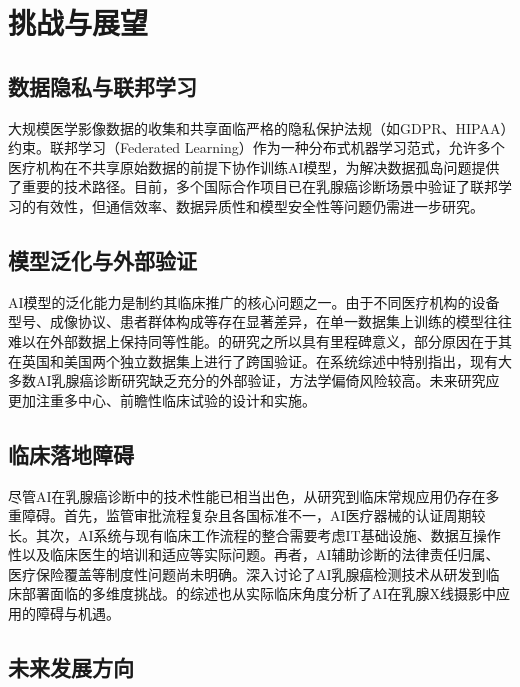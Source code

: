 \documentclass[12pt,a4paper]{article}
\begin{document}
\section{挑战与展望}

\subsection{数据隐私与联邦学习}

大规模医学影像数据的收集和共享面临严格的隐私保护法规（如GDPR、HIPAA）约束。联邦学习（Federated Learning）\citep{mcmahan2017communication}作为一种分布式机器学习范式，允许多个医疗机构在不共享原始数据的前提下协作训练AI模型，为解决数据孤岛问题提供了重要的技术路径\citep{rieke2020future}。目前，多个国际合作项目已在乳腺癌诊断场景中验证了联邦学习的有效性，但通信效率、数据异质性和模型安全性等问题仍需进一步研究。

\subsection{模型泛化与外部验证}

AI模型的泛化能力是制约其临床推广的核心问题之一。由于不同医疗机构的设备型号、成像协议、患者群体构成等存在显著差异，在单一数据集上训练的模型往往难以在外部数据上保持同等性能。\citet{mckinney2020international}的研究之所以具有里程碑意义，部分原因在于其在英国和美国两个独立数据集上进行了跨国验证。\citet{freeman2021use}在系统综述中特别指出，现有大多数AI乳腺癌诊断研究缺乏充分的外部验证，方法学偏倚风险较高。未来研究应更加注重多中心、前瞻性临床试验的设计和实施。

\subsection{临床落地障碍}

尽管AI在乳腺癌诊断中的技术性能已相当出色，从研究到临床常规应用仍存在多重障碍。首先，监管审批流程复杂且各国标准不一，AI医疗器械的认证周期较长。其次，AI系统与现有临床工作流程的整合需要考虑IT基础设施、数据互操作性以及临床医生的培训和适应等实际问题。再者，AI辅助诊断的法律责任归属、医疗保险覆盖等制度性问题尚未明确。\citet{diaz2024artificial}深入讨论了AI乳腺癌检测技术从研发到临床部署面临的多维度挑战。\citet{almuhaisen2024ai}的综述也从实际临床角度分析了AI在乳腺X线摄影中应用的障碍与机遇。

\subsection{未来发展方向}
\end{document}
